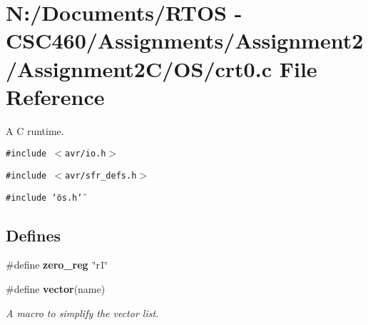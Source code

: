 \section{N:/Documents/RTOS - CSC460/Assignments/Assignment2/Assignment2C/OS/crt0.c File Reference}
\label{crt0_8c}
A C runtime. 

{\tt \#include $<$avr/io.h$>$}\par
{\tt \#include $<$avr/sfr\_\-defs.h$>$}\par
{\tt \#include \char`\"{}os.h\char`\"{}}\par
\subsection*{Defines}
\begin{CompactItemize}
\item 
\#define {\bf zero\_\-reg}~\char`\"{}r1\char`\"{}
\item 
\#define {\bf vector}(name)
\begin{CompactList}\small\item\em A macro to simplify the vector list. \item\end{CompactList}\end{CompactItemize}
